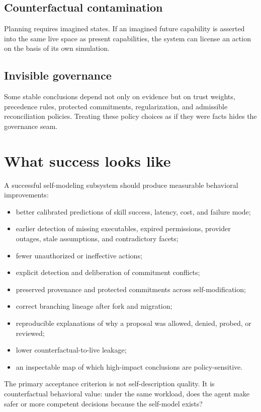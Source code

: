 \documentclass[11pt,oneside]{report}
\begin{document}
\subsection{Counterfactual contamination}
Planning requires imagined states. If an imagined future capability is asserted into the same live space as present capabilities, the system can license an action on the basis of its own simulation.

\subsection{Invisible governance}
Some stable conclusions depend not only on evidence but on trust weights, precedence rules, protected commitments, regularization, and admissible reconciliation policies. Treating these policy choices as if they were facts hides the governance seam.

\section{What success looks like}

A successful self-modeling subsystem should produce measurable behavioral improvements:

\begin{itemize}
  \item better calibrated predictions of skill success, latency, cost, and failure mode;
  \item earlier detection of missing executables, expired permissions, provider outages, stale assumptions, and contradictory facets;
  \item fewer unauthorized or ineffective actions;
  \item explicit detection and deliberation of commitment conflicts;
  \item preserved provenance and protected commitments across self-modification;
  \item correct branching lineage after fork and migration;
  \item reproducible explanations of why a proposal was allowed, denied, probed, or reviewed;
  \item lower counterfactual-to-live leakage;
  \item an inspectable map of which high-impact conclusions are policy-sensitive.
\end{itemize}

The primary acceptance criterion is not self-description quality. It is counterfactual behavioral value: under the same workload, does the agent make safer or more competent decisions because the self-model exists?
\end{document}
